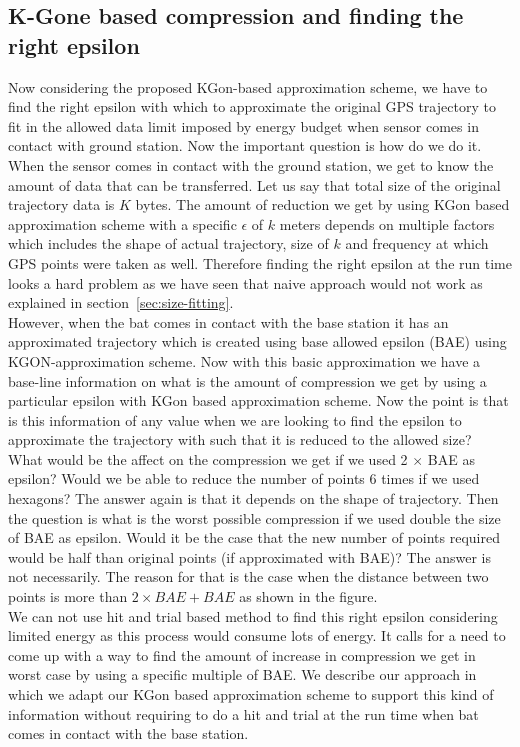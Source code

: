\documentclass[conference]{IEEEtran}
\begin{document}
\subsection{K-Gone based compression and finding the right epsilon}

Now considering the proposed KGon-based approximation scheme, we have to find the right epsilon with which to 
approximate the original GPS trajectory to fit in the allowed data limit imposed by energy budget when sensor comes 
in contact with ground station. Now the important question is how do we do it. When the sensor comes in contact with 
the ground station, we get to know the amount of data that can be transferred. Let us say that total size of the original 
trajectory data is $K$ bytes. The amount of reduction we get by using KGon based approximation scheme with a specific 
$\epsilon$ of $k$ meters depends on multiple factors which includes the shape of actual trajectory, size of $k$ and frequency 
at which GPS points were taken as well. Therefore finding the right epsilon at the run time looks a hard problem as we have 
seen that naive approach would not work as explained in section~\ref{sec:size-fitting}.\\

However, when the bat comes in contact with the base station it has an approximated trajectory which is created using base 
allowed epsilon (BAE) using KGON-approximation scheme. Now with this basic approximation we have a base-line information 
on what is the amount of compression we get by using a particular epsilon with KGon based approximation scheme. Now the 
point is that is this information of any value when we are looking to find the epsilon to approximate the trajectory with such that 
it is reduced to the allowed size?\\

What would be the affect on the compression we get if we used 2 $\times$ BAE as epsilon? Would we be able to reduce the 
number of points 6 times if we used hexagons? The answer again is that it depends on the shape of trajectory. Then the 
question is what is the worst possible compression if we used double the size of BAE as epsilon. Would it be the case that 
the new number of points required would be half than original points (if approximated with BAE)? The answer is not necessarily. 
The reason for that is the case when the distance between two points is more than $2\times BAE+BAE$ as shown in the figure.\\

We can not use hit and trial based method to find this right epsilon considering limited energy as this process would consume 
lots of energy. It calls for a need to come up with a way to find the amount of increase in compression we get in worst case by 
using a specific multiple of BAE. We describe our approach in which we adapt our KGon based approximation scheme to support 
this kind of information without requiring to do a hit and trial at the run time when bat comes in contact with the base station.
\end{document}
